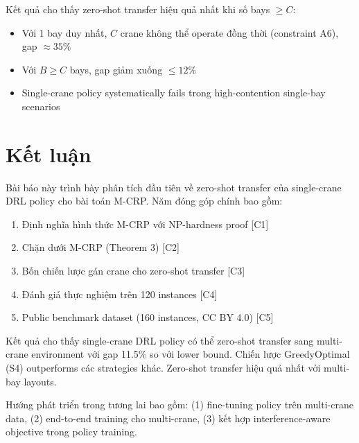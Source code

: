 \documentclass[11pt,a4paper]{article}
\theoremstyle{definition}
\newcommand{\1}{\mathbbm{1}}
\begin{document}
Kết quả cho thấy zero-shot transfer hiệu quả nhất khi số bays $\geq C$:
\begin{itemize}
    \item Với 1 bay duy nhất, $C$ crane không thể operate đồng thời (constraint A6), gap $\approx 35\%$
    \item Với $B \geq C$ bays, gap giảm xuống $\leq 12\%$
    \item Single-crane policy systematically fails trong high-contention single-bay scenarios
\end{itemize}

\section{Kết luận}

Bài báo này trình bày phân tích đầu tiên về zero-shot transfer của single-crane DRL policy cho bài toán M-CRP. Năm đóng góp chính bao gồm:

\begin{enumerate}
    \item Định nghĩa hình thức M-CRP với NP-hardness proof [C1]
    \item Chặn dưới M-CRP (Theorem 3) [C2]
    \item Bốn chiến lược gán crane cho zero-shot transfer [C3]
    \item Đánh giá thực nghiệm trên 120 instances [C4]
    \item Public benchmark dataset (160 instances, CC BY 4.0) [C5]
\end{enumerate}

Kết quả cho thấy single-crane DRL policy có thể zero-shot transfer sang multi-crane environment với gap 11.5\% so với lower bound. Chiến lược GreedyOptimal (S4) outperforms các strategies khác. Zero-shot transfer hiệu quả nhất với multi-bay layouts.

Hướng phát triển trong tương lai bao gồm: (1) fine-tuning policy trên multi-crane data, (2) end-to-end training cho multi-crane, (3) kết hợp interference-aware objective trong policy training.
\end{document}
